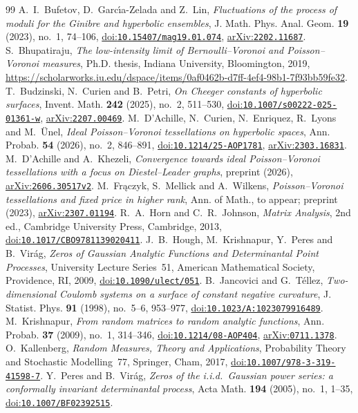 \documentclass[11pt]{amsart}
\theoremstyle{definition}
\theoremstyle{remark}
\newcommand{\doi}[1]{\href{https://doi.org/#1}{doi:\nolinkurl{#1}}}
\newcommand{\arxiv}[1]{\href{https://arxiv.org/abs/#1}{arXiv:\nolinkurl{#1}}}
\begin{document}
\begin{thebibliography}{99}
 A.~I.~Bufetov, D.~Garc\'{\i}a-Zelada and Z.~Lin, \emph{Fluctuations of the process of moduli for the
Ginibre and hyperbolic ensembles}, J. Math. Phys. Anal. Geom. \textbf{19} (2023), no.~1, 74--106,
\doi{10.15407/mag19.01.074}, \arxiv{2202.11687}.
 S.~Bhupatiraju, \emph{The low-intensity limit of Bernoulli--Voronoi and Poisson--Voronoi measures},
Ph.D. thesis, Indiana University, Bloomington, 2019,
\url{https://scholarworks.iu.edu/dspace/items/0af0462b-d7ff-4ef4-98b1-7f93bb59fe32}.
 T.~Budzinski, N.~Curien and B.~Petri, \emph{On Cheeger constants of hyperbolic surfaces}, Invent.
Math. \textbf{242} (2025), no.~2, 511--530, \doi{10.1007/s00222-025-01361-w}, \arxiv{2207.00469}.
 M.~D'Achille, N.~Curien, N.~Enriquez, R.~Lyons and M.~\"Unel, \emph{Ideal Poisson--Voronoi
tessellations on hyperbolic spaces}, Ann. Probab. \textbf{54} (2026), no.~2, 846--891, \doi{10.1214/25-AOP1781},
\arxiv{2303.16831}.
 M.~D'Achille and A.~Khezeli, \emph{Convergence towards ideal Poisson--Voronoi tessellations with a focus
on Diestel--Leader graphs}, preprint (2026), \arxiv{2606.30517v2}.
 M.~Fr\k{a}czyk, S.~Mellick and A.~Wilkens, \emph{Poisson--Voronoi tessellations and fixed price in higher
rank}, Ann. of Math., to appear; preprint (2023), \arxiv{2307.01194}.
 R.~A.~Horn and C.~R.~Johnson, \emph{Matrix Analysis}, 2nd ed., Cambridge University Press, Cambridge,
2013, \doi{10.1017/CBO9781139020411}.
 J.~B.~Hough, M.~Krishnapur, Y.~Peres and B.~Vir\'ag, \emph{Zeros of Gaussian Analytic Functions and
Determinantal Point Processes}, University Lecture Series~51, American Mathematical Society, Providence, RI, 2009,
\doi{10.1090/ulect/051}.
 B.~Jancovici and G.~T\'ellez, \emph{Two-dimensional Coulomb systems on a surface of constant negative
curvature}, J. Statist. Phys. \textbf{91} (1998), no.~5--6, 953--977, \doi{10.1023/A:1023079916489}.
 M.~Krishnapur, \emph{From random matrices to random analytic functions}, Ann. Probab. \textbf{37}
(2009), no.~1, 314--346, \doi{10.1214/08-AOP404}, \arxiv{0711.1378}.
 O.~Kallenberg, \emph{Random Measures, Theory and Applications}, Probability Theory and Stochastic
Modelling~77, Springer, Cham, 2017, \doi{10.1007/978-3-319-41598-7}.
 Y.~Peres and B.~Vir\'ag, \emph{Zeros of the i.i.d.\ Gaussian power series: a conformally invariant
determinantal process}, Acta Math. \textbf{194} (2005), no.~1, 1--35, \doi{10.1007/BF02392515}.

\end{thebibliography}
\end{document}
